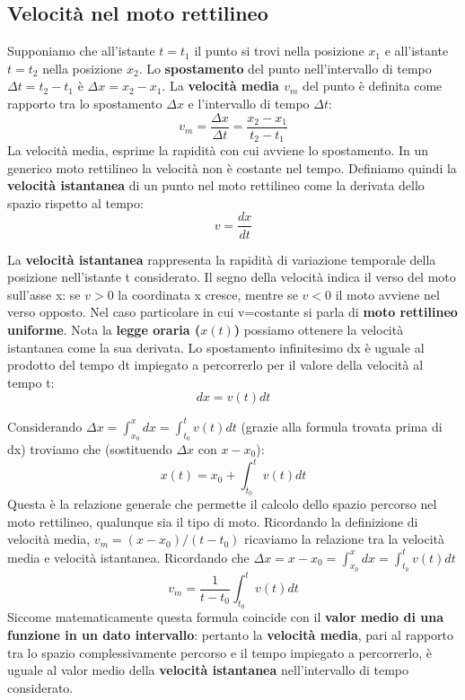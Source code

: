 \documentclass{article}
\numberwithin{equation}{subsection}
\begin{document}
\subsection{Velocità nel moto rettilineo}
Supponiamo che all'istante $t=t_1$ il punto si trovi nella posizione $x_1$ e all'istante $t=t_2$ nella posizione $x_2$. Lo \textbf{spostamento} del punto nell'intervallo di tempo $\Delta t=t_2-t_1$ è $\Delta x=x_2 - x_1$. La \textbf{velocità media $v_m$} del punto è definita come rapporto tra lo spostamento $\Delta x$ e l'intervallo di tempo $\Delta t$:
\begin{equation}
    v_m=\frac{\Delta x}{\Delta t} = \frac{x_2-x_1}{t_2 - t_1}
\end{equation}
La velocità media, esprime la rapidità con cui avviene lo spostamento. In un generico moto rettilineo la velocità non è costante nel tempo. Definiamo quindi la \textbf{velocità istantanea} di un punto nel moto rettilineo come la derivata dello spazio rispetto al tempo:
\begin{equation}
    v = \frac{dx}{dt}
\end{equation}

La \textbf{velocità istantanea} rappresenta la rapidità di variazione temporale della posizione nell'istante t considerato. Il segno della velocità indica il verso del moto sull'asse x: se $v>0$ la coordinata x cresce, mentre se $v<0$ il moto avviene nel verso opposto. Nel caso particolare in cui v=costante si parla di \textbf{moto rettilineo uniforme}. Nota la \textbf{legge oraria ($x(t)$)} possiamo ottenere la velocità istantanea come la sua derivata. Lo spostamento infinitesimo dx è uguale al prodotto del tempo dt impiegato a percorrerlo per il valore della velocità al tempo t:
\begin{equation}
    dx=v(t)dt
\end{equation}

Considerando $\Delta x = \int_{x_0}^x dx = \int_{t_0}^t v(t) dt$ (grazie alla formula trovata prima di dx) troviamo che (sostituendo $\Delta x$ con $x-x_0$):
\begin{equation}
    x(t)=x_0 + \int_{t_0}^t v(t) dt
\end{equation}
Questa è la relazione generale che permette il calcolo dello spazio percorso nel moto rettilineo, qualunque sia il tipo di moto. Ricordando la definizione di velocità media, $v_m = (x-x_0)/(t-t_0)$ ricaviamo la relazione tra la velocità media e velocità istantanea. Ricordando che $\Delta x = x-x_0=\int_{x_0}^x dx = \int_{t_0}^t v(t) dt$
\begin{equation}
v_m = \frac{1}{t-t_0}\int_{t_0}^t v(t) dt
\end{equation}
Siccome matematicamente questa formula coincide con il \textbf{valor medio di una funzione in un dato intervallo}: pertanto la \textbf{velocità media}, pari al rapporto tra lo spazio complessivamente percorso e il tempo impiegato a percorrerlo, è uguale al valor medio della \textbf{velocità istantanea} nell'intervallo di tempo considerato.
\end{document}
